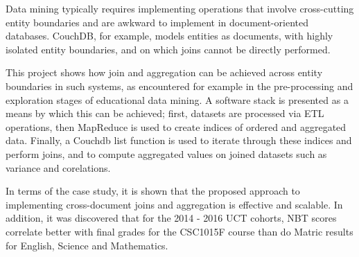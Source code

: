 Data mining typically requires implementing operations that involve cross-cutting entity boundaries and are awkward to implement in document-oriented databases. CouchDB, for example, models entities as documents, with highly isolated entity boundaries, and on which joins cannot be directly performed.

This project shows how join and aggregation can be achieved across entity boundaries in such systems, as encountered for example in the pre-processing and exploration stages of educational data mining. A software stack is presented as a means by which this can be achieved; first, datasets are processed via ETL operations, then MapReduce is used to create indices of ordered and aggregated data. Finally, a Couchdb list function is used to iterate through these indices and perform joins, and
to compute aggregated values on joined datasets such as variance and corelations.

In terms of the case study, it is shown that the proposed approach to implementing cross-document joins and aggregation is effective and scalable. In addition, it was discovered that for the 2014 - 2016 UCT cohorts, NBT scores correlate better with final grades for the CSC1015F course than do Matric results for English, Science and Mathematics.